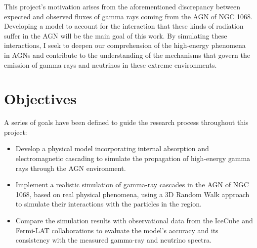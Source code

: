 This project's motivation arises from the aforementioned discrepancy between expected and observed fluxes of gamma rays coming from the AGN of NGC 1068. Developing a model to account for the interaction that these kinds of radiation suffer in the AGN will be the main goal of this work. By simulating these interactions, I seek to deepen our comprehension of the high-energy phenomena in AGNs and contribute to the understanding of the mechanisms that govern the emission of gamma rays and neutrinos in these extreme environments.

\section{Objectives}

A series of goals have been defined to guide the research process throughout this project:

\begin{itemize}
    \item Develop a physical model incorporating internal absorption and electromagnetic cascading to simulate the propagation of high-energy gamma rays through the AGN environment.
    \item Implement a realistic simulation of gamma-ray cascades in the AGN of NGC 1068, based on real physical phenomena, using a 3D Random Walk approach to simulate their interactions with the particles in the region.
    \item Compare the simulation results with observational data from the IceCube and Fermi-LAT collaborations to evaluate the model's accuracy and its consistency with the measured gamma-ray and neutrino spectra.
\end{itemize}